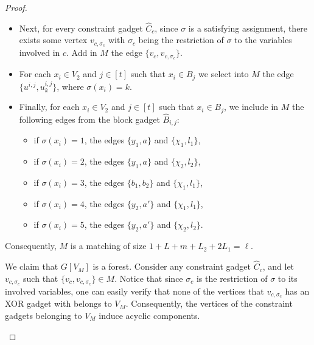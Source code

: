 \begin{proof}
\begin{nestedproof}
\begin{itemize}
                \item Next, for every constraint gadget $\hat{C}_c$, since $\sigma$ is a satisfying assignment,
                there exists some vertex $v_{c,\sigma_c}$ with $\sigma_c$ being the restriction of $\sigma$
                to the variables involved in $c$.
                Add in $M$ the edge $\{v_c,v_{c,\sigma_c}\}$.

                \item For each $x_i \in V_2$ and $j \in [t]$ such that $x_i \in B_j$
                we select into $M$ the edge $\{u^{i,j}, u^{i,j}_k\}$, where $\sigma(x_i) = k$.

                \item Finally, for each $x_i \in V_2$ and $j \in [t]$ such that $x_i \in B_j$,
                we include in $M$ the following edges from the block gadget $\hat{B}_{i,j}$:
                \begin{itemize}
                    \item if $\sigma(x_i) = 1$, the edges $\{ y_1, a \}$ and $\{ \chi_1, l_1 \}$,

                    \item if $\sigma(x_i) = 2$, the edges $\{ y_1, a \}$ and $\{ \chi_2, l_2 \}$,

                    \item if $\sigma(x_i) = 3$, the edges $\{ b_1, b_2 \}$ and $\{ \chi_1, l_1 \}$,

                    \item if $\sigma(x_i) = 4$, the edges $\{ y_2, a' \}$ and $\{ \chi_1, l_1 \}$,

                    \item if $\sigma(x_i) = 5$, the edges $\{ y_2, a' \}$ and $\{ \chi_2, l_2 \}$.
                \end{itemize}
            \end{itemize}
            Consequently, $M$ is a matching of size $1 + L + m + L_2 + 2L_1 = \ell$.

            We claim that $G[V_M]$ is a forest.
            Consider any constraint gadget $\hat{C}_c$,
            and let $v_{c,\sigma_c}$ such that $\{v_c, v_{c,\sigma_c}\} \in M$.
            Notice that since $\sigma_c$ is the restriction of $\sigma$ to its involved variables,
            one can easily verify that none of the vertices that $v_{c,\sigma_c}$ has an XOR gadget with belongs to $V_M$.
            Consequently, the vertices of the constraint gadgets belonging to $V_M$ induce acyclic components.


\end{nestedproof}
\end{proof}
